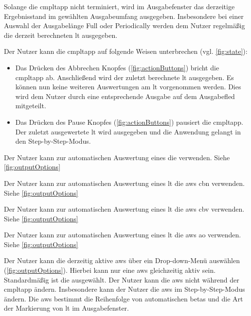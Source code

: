 \documentclass[parskip=full,11pt,twoside]{scrartcl}
\begin{document}
Solange die \gls{cmpltapp} nicht terminiert, wird im Ausgabefenster das derzeitige Ergebnisstand im gewählten Ausgabeumfang ausgegeben. 
Insbesondere bei einer Auswahl der Ausgabelänge Full oder Periodically werden dem Nutzer regelmäßig die derzeit berechneten \gls{lt} ausgegeben.

Der Nutzer kann die \gls{cmpltapp} auf folgende Weisen unterbrechen (vgl. \cref{fig:state}):
\begin{itemize}
	\item Das Drücken des Abbrechen Knopfes (\cref{fig:actionButtons}) bricht die \gls{cmpltapp} ab. 
	Anschließend wird der zuletzt berechnete \gls{lt} ausgegeben. Es können nun keine weiteren Auswertungen am \gls{lt} vorgenommen werden. 
	Dies wird dem Nutzer durch eine entsprechende Ausgabe auf dem Ausgabefled mitgeteilt.
	\item Das Drücken des Pause Knopfes (\cref{fig:actionButtons}) pausiert die \gls{cmpltapp}. 
	Der zuletzt ausgewertete \gls{lt} wird ausgegeben und die Anwendung gelangt in den Step-by-Step-Modus.
\end{itemize}

Der Nutzer kann zur automatischen Auswertung eines  die  verwenden. Siehe \cref{fig:outputOptions}

Der Nutzer kann zur automatischen Auswertung eines \gls{lt} die \gls{aws} \gls{cbn} verwenden. Siehe \cref{fig:outputOptions}

Der Nutzer kann zur automatischen Auswertung eines \gls{lt} die \gls{aws} \gls{cbv} verwenden. Siehe \cref{fig:outputOptions}

Der Nutzer kann zur automatischen Auswertung eines \gls{lt} die \gls{aws} \gls{ao} verwenden. Siehe \cref{fig:outputOptions}

Der Nutzer kann die derzeitig aktive \gls{aws} über ein Drop-down-Menü auswählen (\cref{fig:outputOptions}). 
Hierbei kann nur eine \gls{aws} gleichzeitig aktiv sein. 
Standardmäßig ist die  ausgewählt. 
Der Nutzer kann die \gls{aws} nicht während der \gls{cmpltapp} ändern. 
Insbesondere kann der Nutzer die \gls{aws} im Step-by-Step-Modus ändern.
Die \gls{aws} bestimmt die Reihenfolge von automatischen \glspl{beta} und die Art der Markierung von \gls{lt} im Ausgabefenster.
\end{document}
